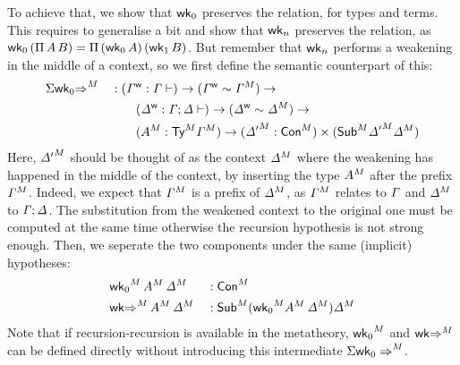   To achieve that, we show that $\mathsf{wk}_0$ preserves the relation, for types and terms.
  This requires to generalise a bit and show that $\mathsf{wk}_n$ preserves the relation,
  as $\mathsf{wk}_0\,(\Pi\,A\,B)=\Pi\,(\mathsf{wk}_0\,A)\,(\mathsf{wk}_1\,B)$.
  But remember that $\mathsf{wk}_n$ performs a weakening in the middle of a context, so
  we first define the semantic counterpart of this:
\begin{alignat*}{5}
  & {\Sigma\mathsf{wk}_0{\Rightarrow}}^M  && :
  ({\mathit{\Gamma}}^{\mathsf{w}} : \mathit{\Gamma} \vdash) \rightarrow
  ({\mathit{\Gamma}}^{\mathsf{w}} \sim {\mathit{\Gamma}}^M) \rightarrow
  \\
  & && \qquad
  ({\mathit{\Delta}}^{\mathsf{w}} : \mathit{\Gamma};\mathit{\Delta} \vdash) \rightarrow
  ({\mathit{\Delta}}^{\mathsf{w}} \sim {\mathit{\Delta}}^M) \rightarrow
  \\ &&& \qquad
  ({A}^M : {\mathsf{Ty}}^M{\mathit{\Gamma}}^M)\rightarrow
  ({\mathit{\Delta}'}^M : {\mathsf{Con}}^M) \times ({\mathsf{Sub}}^M{\mathit{\Delta}'}^M{{\mathit{\Delta}}^M})
\end{alignat*}
Here, ${\mathit{\Delta}'}^M$ should be thought of as the context ${\mathit{\Delta}}^M$ where
the weakening has happened in the middle of the context, by inserting the type
${A}^M$ after the prefix ${\mathit{\Gamma}}^M$. Indeed, we expect that
${\mathit{\Gamma}}^M$ is a prefix of ${\mathit{\Delta}}^M$, as ${\mathit{\Gamma}}^M$ relates to
$\mathit{\Gamma}$ and ${\mathit{\Delta}}^M$ to $\mathit{\Gamma};\mathit{\Delta}$.
The substitution from the weakened context to the original one must
be computed at the same time otherwise the recursion hypothesis is not strong enough.
Then, we seperate the two components under the same (implicit) hypotheses:
\begin{alignat*}{5}
  & {\mathsf{wk}_0}^M\,{A}^M\,{\mathit{\Delta}}^M  && :
   {\mathsf{Con}}^M
   \\
  & {\mathsf{wk}{\Rightarrow}}^M\,{A}^M\,{\mathit{\Delta}}^M  && :
   {\mathsf{Sub}}^M({\mathsf{wk}_0}^M{A}^M\,{\mathit{\Delta}}^M){\mathit{\Delta}}^M
\end{alignat*}
Note that if recursion-recursion is available in the metatheory, ${\mathsf{wk}_0}^M$
and $\mathsf{wk}{\Rightarrow}^M$ can be defined directly without introducing this
intermediate ${\Sigma\mathsf{wk}_0\Rightarrow}^M$.


